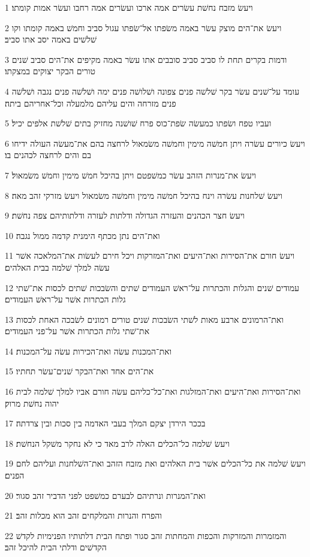 \par 1 ויעשׂ מזבח נחשׁת עשׂרים אמה ארכו ועשׂרים אמה רחבו ועשׂר אמות קומתו׃
\par 2 ויעשׂ את־הים מוצק עשׂר באמה משׂפתו אל־שׂפתו עגול סביב וחמשׁ באמה קומתו וקו שׁלשׁים באמה יסב אתו סביב׃
\par 3 ודמות בקרים תחת לו סביב סביב סובבים אתו עשׂר באמה מקיפים את־הים סביב שׁנים טורים הבקר יצוקים במצקתו׃
\par 4 עומד על־שׁנים עשׂר בקר שׁלשׁה פנים צפונה ושׁלושׁה פנים ימה ושׁלשׁה פנים נגבה ושׁלשׁה פנים מזרחה והים עליהם מלמעלה וכל־אחריהם ביתה׃
\par 5 ועביו טפח ושׂפתו כמעשׂה שׂפת־כוס פרח שׁושׁנה מחזיק בתים שׁלשׁת אלפים יכיל׃
\par 6 ויעשׂ כיורים עשׂרה ויתן חמשׁה מימין וחמשׁה משׂמאול לרחצה בהם את־מעשׂה העולה ידיחו בם והים לרחצה לכהנים בו׃
\par 7 ויעשׂ את־מנרות הזהב עשׂר כמשׁפטם ויתן בהיכל חמשׁ מימין וחמשׁ משׂמאול׃
\par 8 ויעשׂ שׁלחנות עשׂרה וינח בהיכל חמשׁה מימין וחמשׁה משׂמאול ויעשׂ מזרקי זהב מאה׃
\par 9 ויעשׂ חצר הכהנים והעזרה הגדולה ודלתות לעזרה ודלתותיהם צפה נחשׁת׃
\par 10 ואת־הים נתן מכתף הימנית קדמה ממול נגבה׃
\par 11 ויעשׂ חורם את־הסירות ואת־היעים ואת־המזרקות ויכל חירם לעשׂות את־המלאכה אשׁר עשׂה למלך שׁלמה בבית האלהים׃
\par 12 עמודים שׁנים והגלות והכתרות על־ראשׁ העמודים שׁתים והשׂבכות שׁתים לכסות את־שׁתי גלות הכתרות אשׁר על־ראשׁ העמודים׃
\par 13 ואת־הרמונים ארבע מאות לשׁתי השׂבכות שׁנים טורים רמונים לשׂבכה האחת לכסות את־שׁתי גלות הכתרות אשׁר על־פני העמודים׃
\par 14 ואת־המכנות עשׂה ואת־הכירות עשׂה על־המכנות׃
\par 15 את־הים אחד ואת־הבקר שׁנים־עשׂר תחתיו׃
\par 16 ואת־הסירות ואת־היעים ואת־המזלגות ואת־כל־כליהם עשׂה חורם אביו למלך שׁלמה לבית יהוה נחשׁת מרוק׃
\par 17 בככר הירדן יצקם המלך בעבי האדמה בין סכות ובין צרדתה׃
\par 18 ויעשׂ שׁלמה כל־הכלים האלה לרב מאד כי לא נחקר משׁקל הנחשׁת׃
\par 19 ויעשׂ שׁלמה את כל־הכלים אשׁר בית האלהים ואת מזבח הזהב ואת־השׁלחנות ועליהם לחם הפנים׃
\par 20 ואת־המנרות ונרתיהם לבערם כמשׁפט לפני הדביר זהב סגור׃
\par 21 והפרח והנרות והמלקחים זהב הוא מכלות זהב׃
\par 22 והמזמרות והמזרקות והכפות והמחתות זהב סגור ופתח הבית דלתותיו הפנימיות לקדשׁ הקדשׁים ודלתי הבית להיכל זהב׃

